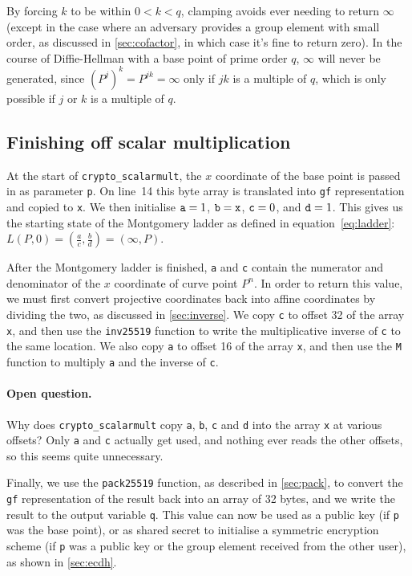 \documentclass{article}
\begin{document}
By forcing $k$ to be within $0 < k < q$, clamping avoids ever needing to return $\infty$ (except in the case where an adversary provides a group element with small order, as discussed in \autoref{sec:cofactor}, in which case it's fine to return zero).
In the course of Diffie-Hellman with a base point of prime order $q$, $\infty$ will never be generated, since $(P^j)^k = P^{jk} = \infty$ only if $jk$ is a multiple of $q$, which is only possible if $j$ or $k$ is a multiple of $q$.

\subsection{Finishing off scalar multiplication}

At the start of \verb|crypto_scalarmult|, the $x$ coordinate of the base point is passed in as parameter \verb|p|.
On line~14 this byte array is translated into \verb|gf| representation and copied to \verb|x|.
We then initialise $\verb|a|=1$, $\verb|b|=\verb|x|$, $\verb|c|=0$, and $\verb|d|=1$.
This gives us the starting state of the Montgomery ladder as defined in equation~\eqref{eq:ladder}: $L(P, 0) = (\frac{a}{c}, \frac{b}{d}) = (\infty, P)$.

After the Montgomery ladder is finished, \verb|a| and \verb|c| contain the numerator and denominator of the $x$ coordinate of curve point $P^n$.
In order to return this value, we must first convert projective coordinates back into affine coordinates by dividing the two, as discussed in \autoref{sec:inverse}.
We copy \verb|c| to offset 32 of the array \verb|x|, and then use the \verb|inv25519| function to write the multiplicative inverse of \verb|c| to the same location.
We also copy \verb|a| to offset 16 of the array \verb|x|, and then use the \verb|M| function to multiply \verb|a| and the inverse of \verb|c|.

\paragraph{Open question.}
Why does \verb|crypto_scalarmult| copy \verb|a|, \verb|b|, \verb|c| and \verb|d| into the array \verb|x| at various offsets?
Only \verb|a| and \verb|c| actually get used, and nothing ever reads the other offsets, so this seems quite unnecessary.
\vspace{1pt}

Finally, we use the \verb|pack25519| function, as described in \autoref{sec:pack}, to convert the \verb|gf| representation of the result back into an array of 32 bytes, and we write the result to the output variable \verb|q|.
This value can now be used as a public key (if \verb|p| was the base point), or as shared secret to initialise a symmetric encryption scheme (if \verb|p| was a public key or the group element received from the other user), as shown in \autoref{sec:ecdh}.
\end{document}
